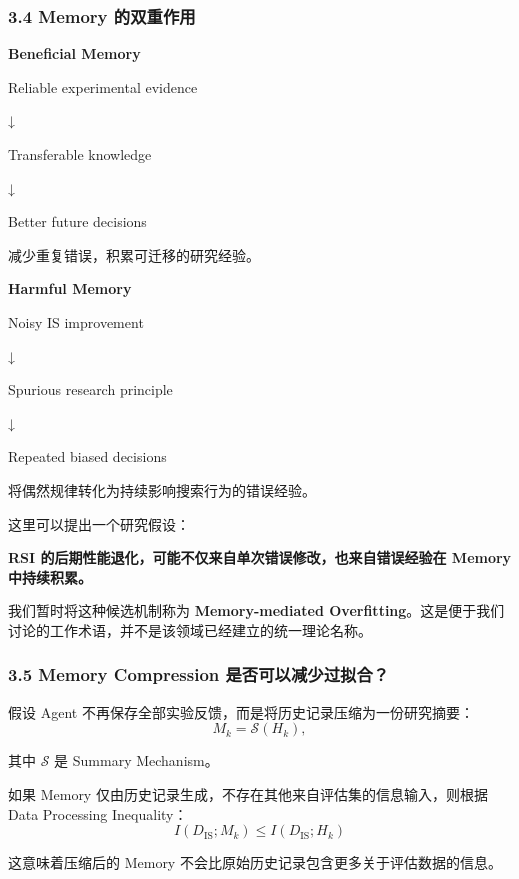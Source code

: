 \hypertarget{part-3-34-0001-memory-ux7684ux53ccux91cdux4f5cux7528}{%
\subsubsection{3.4 Memory 的双重作用}\label{part-3-34-0001-memory-ux7684ux53ccux91cdux4f5cux7528}}

\textbf{Beneficial Memory}

Reliable experimental evidence

↓

Transferable knowledge

↓

Better future decisions

减少重复错误，积累可迁移的研究经验。

\textbf{Harmful Memory}

Noisy IS improvement

↓

Spurious research principle

↓

Repeated biased decisions

将偶然规律转化为持续影响搜索行为的错误经验。

这里可以提出一个研究假设：

\textbf{RSI 的后期性能退化，可能不仅来自单次错误修改，也来自错误经验在 Memory 中持续积累。}

我们暂时将这种候选机制称为 \textbf{Memory-mediated Overfitting}。这是便于我们讨论的工作术语，并不是该领域已经建立的统一理论名称。

\hypertarget{part-3-34-0001-memory-compression-ux662fux5426ux53efux4ee5ux51cfux5c11ux8fc7ux62dfux5408}{%
\subsubsection{3.5 Memory Compression 是否可以减少过拟合？}\label{part-3-34-0001-memory-compression-ux662fux5426ux53efux4ee5ux51cfux5c11ux8fc7ux62dfux5408}}

假设 Agent 不再保存全部实验反馈，而是将历史记录压缩为一份研究摘要：
\[M_k=\mathcal S(H_k),\]

其中 \(\mathcal S\) 是 Summary Mechanism。

如果 Memory 仅由历史记录生成，不存在其他来自评估集的信息输入，则根据 Data Processing Inequality：
\[\boxed{
I(D_{\mathrm{IS}};M_k)
\leq
I(D_{\mathrm{IS}};H_k)
}\]

这意味着压缩后的 Memory 不会比原始历史记录包含更多关于评估数据的信息。

